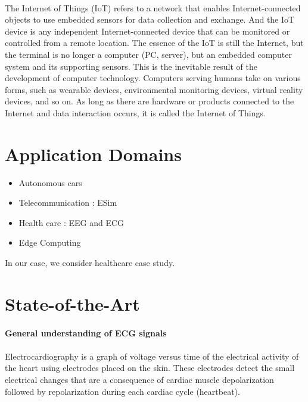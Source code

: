 \documentclass{article}
\begin{document}
\paragraph{}

The Internet of Things (IoT) refers to a network that enables Internet-connected objects to use embedded sensors for data collection and exchange. And the IoT device is any independent Internet-connected device that can be monitored or controlled from a remote location. The essence of the IoT is still the Internet, but the terminal is no longer a computer (PC, server), but an embedded computer system and its supporting sensors. This is the inevitable result of the development of computer technology. Computers serving humans take on various forms, such as wearable devices, environmental monitoring devices, virtual reality devices, and so on. As long as there are hardware or products connected to the Internet and data interaction occurs, it is called the Internet of Things.

\section{Application Domains}

\begin{itemize}
	\item Autonomous cars
	\item Telecommunication : ESim
	\item Health care  : EEG and ECG
	\item Edge Computing 
\end{itemize}

In our case, we consider healthcare case study. 

\section{State-of-the-Art}

\paragraph{General understanding of ECG signals} 

\paragraph{}

Electrocardiography is a graph of voltage versus time of the electrical activity of the heart using electrodes placed on the skin\cite{ref1}. These electrodes detect the small electrical changes that are a consequence of cardiac muscle depolarization followed by repolarization during each cardiac cycle (heartbeat). 
\end{document}
